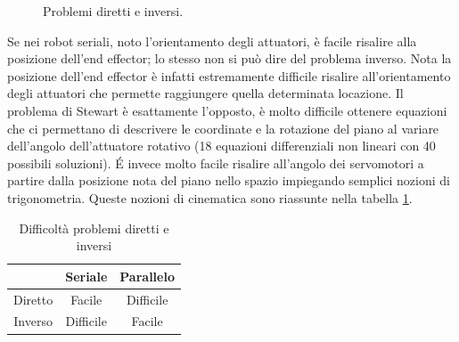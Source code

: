 \documentclass[11pt]{article}
\begin{document}
\begin{figure}[h!]
\centering
{}
\caption{Problemi diretti e inversi.} \label{fig:direttoinverso}
\end{figure}

Se nei robot seriali, noto l'orientamento degli attuatori, è facile risalire alla posizione dell'end effector; lo stesso non si può dire del problema inverso. Nota la posizione dell'end effector è infatti estremamente difficile risalire all'orientamento degli attuatori che permette raggiungere quella determinata locazione. Il problema di Stewart è esattamente l'opposto, è molto difficile ottenere equazioni che ci permettano di descrivere le coordinate e la rotazione del piano al variare dell'angolo dell'attuatore rotativo (18 equazioni differenziali non lineari con 40 possibili soluzioni). É invece molto facile risalire all'angolo dei servomotori a partire dalla posizione nota del piano nello spazio impiegando semplici nozioni di trigonometria. Queste nozioni di cinematica sono riassunte nella tabella \ref{fig:tabella}.

\begin{table}[h!]
\centering
\begin{tabular}{c|cc}
        & Seriale   & Parallelo  \\ 
\hline
Diretto & Facile    & Difficile  \\
Inverso & Difficile & Facile    
\end{tabular}
\caption{Difficoltà problemi diretti e inversi} \label{fig:tabella}
\end{table}
\end{document}
